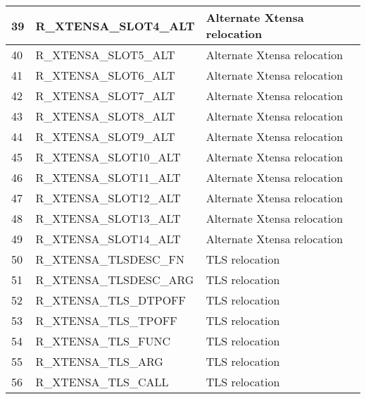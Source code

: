 \begin{smalltables}
\begin{longtable}{|p{1cm}|p{6cm}|p{10cm}|}
	39 & R\_XTENSA\_SLOT4\_ALT & Alternate Xtensa relocation \\ \hline
	40 & R\_XTENSA\_SLOT5\_ALT & Alternate Xtensa relocation \\ \hline
	41 & R\_XTENSA\_SLOT6\_ALT & Alternate Xtensa relocation \\ \hline
	42 & R\_XTENSA\_SLOT7\_ALT & Alternate Xtensa relocation \\ \hline
	43 & R\_XTENSA\_SLOT8\_ALT & Alternate Xtensa relocation \\ \hline
	44 & R\_XTENSA\_SLOT9\_ALT & Alternate Xtensa relocation \\ \hline
	45 & R\_XTENSA\_SLOT10\_ALT & Alternate Xtensa relocation \\ \hline
	46 & R\_XTENSA\_SLOT11\_ALT & Alternate Xtensa relocation \\ \hline
	47 & R\_XTENSA\_SLOT12\_ALT & Alternate Xtensa relocation \\ \hline
	48 & R\_XTENSA\_SLOT13\_ALT & Alternate Xtensa relocation \\ \hline
	49 & R\_XTENSA\_SLOT14\_ALT & Alternate Xtensa relocation \\ \hline
	50 & R\_XTENSA\_TLSDESC\_FN & TLS relocation \\ \hline
	51 & R\_XTENSA\_TLSDESC\_ARG & TLS relocation \\ \hline
	52 & R\_XTENSA\_TLS\_DTPOFF & TLS relocation \\ \hline
	53 & R\_XTENSA\_TLS\_TPOFF & TLS relocation \\ \hline
	54 & R\_XTENSA\_TLS\_FUNC & TLS relocation \\ \hline
	55 & R\_XTENSA\_TLS\_ARG & TLS relocation \\ \hline
	56 & R\_XTENSA\_TLS\_CALL & TLS relocation \\ \hline
\end{longtable}
\end{smalltables}